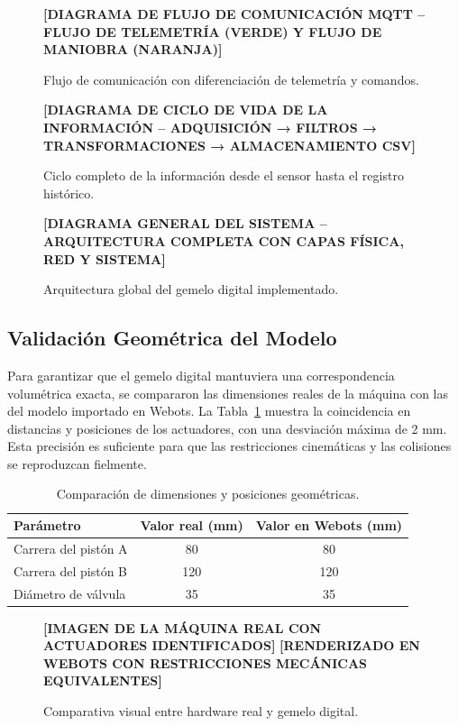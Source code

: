 \begin{figure}[htbp]
\centering
\textbf{[DIAGRAMA DE FLUJO DE COMUNICACIÓN MQTT – FLUJO DE TELEMETRÍA (VERDE) Y FLUJO DE MANIOBRA (NARANJA)]}
\caption{Flujo de comunicación con diferenciación de telemetría y comandos.}
\label{fig:flujo_mqtt}
\end{figure}

\begin{figure}[htbp]
\centering
\textbf{[DIAGRAMA DE CICLO DE VIDA DE LA INFORMACIÓN – ADQUISICIÓN → FILTROS → TRANSFORMACIONES → ALMACENAMIENTO CSV]}
\caption{Ciclo completo de la información desde el sensor hasta el registro histórico.}
\label{fig:ciclo_info}
\end{figure}

\begin{figure}[htbp]
\centering
\textbf{[DIAGRAMA GENERAL DEL SISTEMA – ARQUITECTURA COMPLETA CON CAPAS FÍSICA, RED Y SISTEMA]}
\caption{Arquitectura global del gemelo digital implementado.}
\label{fig:arq_general}
\end{figure}

\subsection{Validación Geométrica del Modelo}

Para garantizar que el gemelo digital mantuviera una correspondencia volumétrica exacta, se compararon las dimensiones reales de la máquina con las del modelo importado en Webots. La Tabla~\ref{tab:comp_geom} muestra la coincidencia en distancias y posiciones de los actuadores, con una desviación máxima de 2 mm. Esta precisión es suficiente para que las restricciones cinemáticas y las colisiones se reproduzcan fielmente.

\begin{table}[htbp]
\centering
\caption{Comparación de dimensiones y posiciones geométricas.}
\label{tab:comp_geom}
\begin{tabular}{lcc}
\hline
\textbf{Parámetro} & \textbf{Valor real (mm)} & \textbf{Valor en Webots (mm)} \\
\hline
Carrera del pistón A & 80 & 80 \\
Carrera del pistón B & 120 & 120 \\
Diámetro de válvula & 35 & 35 \\
\hline
\end{tabular}
\end{table}

\begin{figure}[htbp]
\centering
\textbf{[IMAGEN DE LA MÁQUINA REAL CON ACTUADORES IDENTIFICADOS]} \hfill \textbf{[RENDERIZADO EN WEBOTS CON RESTRICCIONES MECÁNICAS EQUIVALENTES]}
\caption{Comparativa visual entre hardware real y gemelo digital.}
\label{fig:comp_visual}
\end{figure}

